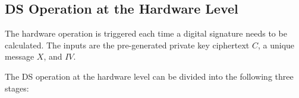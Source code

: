 \documentclass[main\_\_EN.tex]{subfiles}
\begin{document}
\subsection{DS Operation at the Hardware Level}
\label{sec:digsig-hardware-level-operation}

The hardware operation is triggered each time a digital signature needs to be calculated. The inputs are the pre-generated private key ciphertext \begin{math}C\end{math}, a unique message \begin{math}X\end{math}, and \begin{math}IV\end{math}.

The DS operation at the hardware level can be divided into the following three stages:
\end{document}
